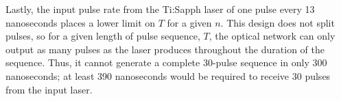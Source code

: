 \documentclass[pdftex,12pt,a4paper]{article}
\begin{document}
Lastly, the input pulse rate from the Ti:Sapph laser of one pulse every 13 nanoseconds places a lower limit on $T$ for a given $n$. This design does not split pulses, so for a given length of pulse sequence, $T$, the optical network can only output as many pulses as the laser produces throughout the duration of the sequence. Thus, it cannot generate a complete 30-pulse sequence in only 300 nanoseconds; at least 390 nanoseconds would be required to receive 30 pulses from the input laser.


\newpage



\end{document}
